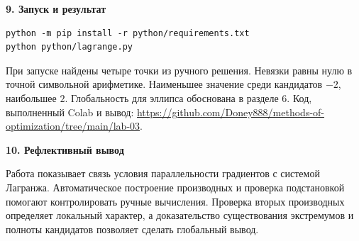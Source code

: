 \documentclass[12pt,a4paper]{article}
\begin{document}
\textbf{9. Запуск и результат}
\begin{verbatim}
python -m pip install -r python/requirements.txt
python python/lagrange.py
\end{verbatim}
При запуске найдены четыре точки из ручного решения. Невязки равны нулю
в точной символьной арифметике. Наименьшее значение среди кандидатов $-2$,
наибольшее $2$. Глобальность для эллипса обоснована в разделе 6.
Код, выполненный Colab и вывод:
\url{https://github.com/Doney888/methods-of-optimization/tree/main/lab-03}.

\textbf{10. Рефлективный вывод}

Работа показывает связь условия параллельности градиентов с системой
Лагранжа. Автоматическое построение производных и проверка подстановкой
помогают контролировать ручные вычисления. Проверка вторых производных
определяет локальный характер, а доказательство существования экстремумов
и полноты кандидатов позволяет сделать глобальный вывод.
\end{document}
